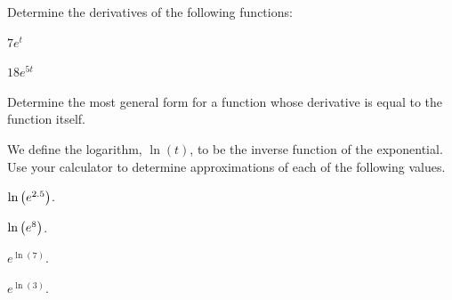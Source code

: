 \begin{problem}
\item Determine the derivatives of the following functions:
  \begin{subproblem}
  \item $7e^{t}$
    \vfill
  \item $18e^{5t}$
    \vfill
  \end{subproblem}
\item Determine the most general form for a function whose derivative
  is equal to the function itself.
  \vfill

\clearpage

\item We define the logarithm, $\ln(t)$, to be the inverse function of
  the exponential.  Use your calculator to determine approximations of
  each of the following values.
  \begin{subproblem}
  \item $\ln\left( e^{2.5} \right)$.
    \vfill
  \item $\ln\left( e^{8} \right)$.
    \vfill
  \item $e^{\ln(7)}$.
    \vfill
  \item $e^{\ln(3)}$.
    \vfill
  \end{subproblem}



\end{problem}


